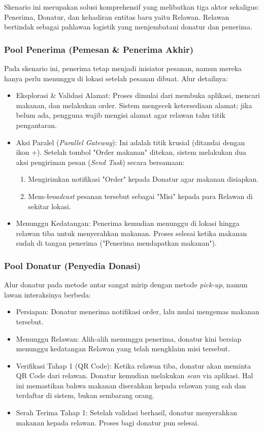 \newpage

Skenario ini merupakan solusi komprehensif yang melibatkan tiga aktor sekaligus: Penerima, Donatur, dan kehadiran entitas baru yaitu Relawan. Relawan bertindak sebagai pahlawan logistik yang menjembatani donatur dan penerima.

\subsubsection{Pool Penerima (Pemesan \& Penerima Akhir)}
Pada skenario ini, penerima tetap menjadi inisiator pesanan, namun mereka hanya perlu menunggu di lokasi setelah pesanan dibuat. Alur detailnya:
\begin{itemize}
    \item Eksplorasi \& Validasi Alamat: Proses dimulai dari membuka aplikasi, mencari makanan, dan melakukan order. Sistem mengecek ketersediaan alamat; jika belum ada, pengguna wajib mengisi alamat agar relawan tahu titik pengantaran.
    \item Aksi Paralel (\textit{Parallel Gateway}): Ini adalah titik krusial (ditandai dengan ikon +). Setelah tombol "Order makanan" ditekan, sistem melakukan dua aksi pengiriman pesan (\textit{Send Task}) secara bersamaan:
    \begin{enumerate}
        \item Mengirimkan notifikasi "Order" kepada Donatur agar makanan disiapkan.
        \item Mem-\textit{broadcast} pesanan tersebut sebagai "Misi" kepada para Relawan di sekitar lokasi.
    \end{enumerate}
    \item Menunggu Kedatangan: Penerima kemudian menunggu di lokasi hingga relawan tiba untuk menyerahkan makanan. Proses selesai ketika makanan sudah di tangan penerima ("Penerima mendapatkan makanan").
\end{itemize}

\subsubsection{Pool Donatur (Penyedia Donasi)}
Alur donatur pada metode antar sangat mirip dengan metode \textit{pick-up}, namun lawan interaksinya berbeda:
\begin{itemize}
    \item Persiapan: Donatur menerima notifikasi order, lalu mulai mengemas makanan tersebut.
    \item Menunggu Relawan: Alih-alih menunggu penerima, donatur kini bersiap menunggu kedatangan Relawan yang telah mengklaim misi tersebut.
    \item Verifikasi Tahap 1 (QR Code): Ketika relawan tiba, donatur akan meminta QR Code dari relawan. Donatur kemudian melakukan \textit{scan} via aplikasi. Hal ini memastikan bahwa makanan diserahkan kepada relawan yang sah dan terdaftar di sistem, bukan sembarang orang.
    \item Serah Terima Tahap 1: Setelah validasi berhasil, donatur menyerahkan makanan kepada relawan. Proses bagi donatur pun selesai.
\end{itemize}

